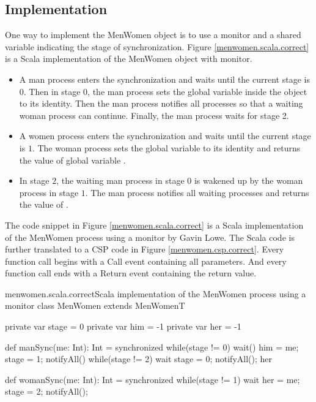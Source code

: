 \documentclass{article}
\begin{document}
\subsection{Implementation}
One way to implement the MenWomen object is to use a monitor and a shared variable indicating the stage of synchronization. Figure \ref{menwomen.scala.correct} is a Scala implementation of the MenWomen object with monitor.
\begin{itemize}
  \item A man process enters the synchronization and waits until the current stage is $0$. Then in stage $0$, the man process sets the global variable  inside the  object to its identity. Then the man process notifies all processes so that a waiting woman process can continue. Finally, the man process waits for stage 2.
  \item A women process enters the synchronization and waits until the current stage is $1$. The woman process sets the global variable  to its identity and returns the value of global variable .
  \item In stage $2$, the waiting man process in stage $0$ is wakened up by the woman process in stage $1$. The man process notifies all waiting processes and returns the value of .
\end{itemize}

The code snippet in Figure \ref{menwomen.scala.correct} is a Scala implementation of the MenWomen process using a monitor by Gavin Lowe. The Scala code is further translated to a CSP code in Figure \ref{menwomen.csp.correct}. Every function call begins with a Call event containing all parameters. And every function call ends with a Return event containing the return value.

\begin{scalafloat}{menwomen.scala.correct}{Scala implementation of the MenWomen process using a monitor}
class MenWomen extends MenWomenT{
  private var stage = 0
  private var him = -1
  private var her = -1

  def manSync(me: Int): Int = synchronized{
    while(stage != 0) wait()         
    him = me; stage = 1; notifyAll() 
    while(stage != 2) wait
    stage = 0; notifyAll(); her
  }

  def womanSync(me: Int): Int = synchronized{
    while(stage != 1) wait
    her = me; stage = 2; notifyAll();
  }
}
\end{scalafloat}
\end{document}
